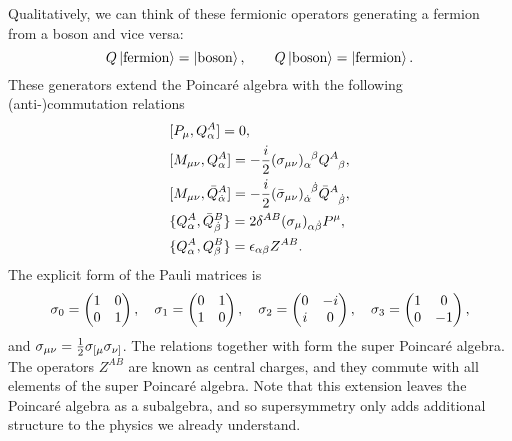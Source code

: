 Qualitatively, we can think of these fermionic operators generating a fermion from a boson and vice versa:
\begin{equation*}
	Q \ket{\text{fermion}} = \ket{\text{boson}}, \qquad Q \ket{\text{boson}} = \ket{\text{fermion}}.
\end{equation*}
These generators extend the Poincar\'e algebra with the following (anti-)commutation relations
\begin{equation}
\label{eq:superpoincaregroup}
\begin{aligned}
	&[P_\mu, Q_\alpha^A] = 0, \\
	&[M_{\mu \nu}, Q_\alpha^A] = - \frac{i}{2} \tensor{(\sigma_{\mu \nu})}{_\alpha^\beta} \tensor{Q}{^A_\beta}, \\
	&[M_{\mu \nu}, \bar{Q}_{\dot{\alpha}}^A] = - \frac{i}{2} \tensor{(\bar{\sigma}_{\mu \nu})}{_{\dot{\alpha}}^{\dot{\beta}}} \tensor{\bar{Q}}{^A_{\dot{\beta}}}, \\
	&\{ Q_\alpha^A,  \bar{Q}_{\dot{\beta}}^B \} = 2 \delta^{AB} (\sigma_\mu)_{\alpha \dot{\beta}} P^\mu ,\\
	&\{ Q_\alpha^A,Q_\beta^B \} = \epsilon_{\alpha \beta} Z^{AB} .
\end{aligned}
\end{equation}
The explicit form of the Pauli matrices is
\begin{equation*}
	\sigma_0 = \begin{pmatrix} 1 & 0 \\ 0 & 1\end{pmatrix}, \quad 
	\sigma_1 = \begin{pmatrix} 0 & 1 \\ 1 & 0\end{pmatrix}, \quad
	\sigma_2 = \begin{pmatrix} 0 & -i \\ i & 0\end{pmatrix}, \quad
	\sigma_3 = \begin{pmatrix} 1 & 0 \\ 0 & -1\end{pmatrix},
\end{equation*}
and $\sigma_{\mu \nu} = \frac{1}{2} \sigma_{[\mu} \sigma_{\nu]}$. The relations  together with  form the super Poincar\'e algebra. The operators $Z^{AB}$ are known as central charges, and they commute with all elements of the super Poincar\'e algebra. Note that this extension leaves the Poincar\'e algebra as a subalgebra, and so supersymmetry only adds additional structure to the physics we already understand.

